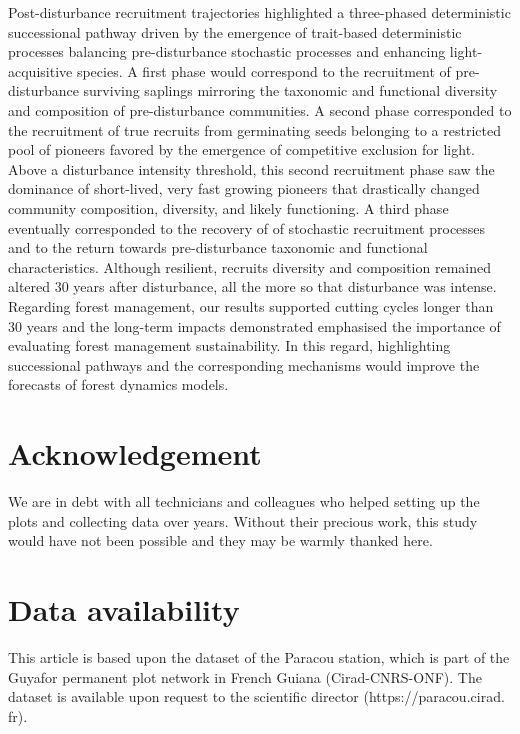 \documentclass[fleqn,10pt]{ArtEcoFoG} %
\begin{document}
Post-disturbance recruitment trajectories highlighted a three-phased
deterministic successional pathway driven by the emergence of
trait-based deterministic processes balancing pre-disturbance stochastic
processes and enhancing light-acquisitive species. A first phase would
correspond to the recruitment of pre-disturbance surviving saplings
mirroring the taxonomic and functional diversity and composition of
pre-disturbance communities. A second phase corresponded to the
recruitment of true recruits from germinating seeds belonging to a
restricted pool of pioneers favored by the emergence of competitive
exclusion for light. Above a disturbance intensity threshold, this
second recruitment phase saw the dominance of short-lived, very fast
growing pioneers that drastically changed community composition,
diversity, and likely functioning. A third phase eventually corresponded
to the recovery of of stochastic recruitment processes and to the return
towards pre-disturbance taxonomic and functional characteristics.
Although resilient, recruits diversity and composition remained altered
30 years after disturbance, all the more so that disturbance was
intense. Regarding forest management, our results supported cutting
cycles longer than 30 years and the long-term impacts demonstrated
emphasised the importance of evaluating forest management
sustainability. In this regard, highlighting successional pathways and
the corresponding mechanisms would improve the forecasts of forest
dynamics models.

\section{Acknowledgement}\label{acknowledgement}

We are in debt with all technicians and colleagues who helped setting up
the plots and collecting data over years. Without their precious work,
this study would have not been possible and they may be warmly thanked
here.

\section{Data availability}\label{data-availability}

This article is based upon the dataset of the Paracou station, which is
part of the Guyafor permanent plot network in French Guiana
(Cirad-CNRS-ONF). The dataset is available upon request to the
scientific director (https://paracou.cirad. fr).
\end{document}
